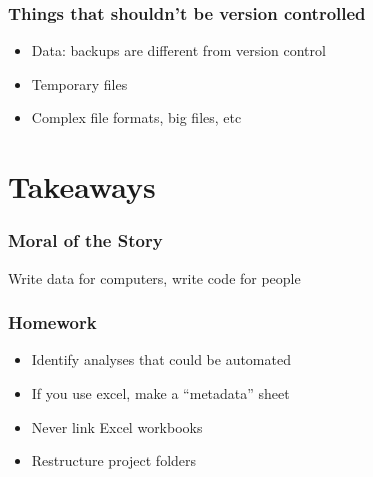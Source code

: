 \documentclass[10pt, compress]{beamer}
\begin{document}
\begin{frame}[fragile]
  \frametitle{Things that shouldn't be version controlled}
  \begin{itemize}
  \item Data: backups are different from version control
  \item Temporary files
  \item Complex file formats, big files, etc
\end{itemize}
\end{frame}

\section{Takeaways}
\begin{frame}[fragile]
  \frametitle{Moral of the Story}
  Write data for computers, write code for people
\end{frame}

\begin{frame}[fragile]
  \frametitle{Homework}
  \begin{itemize}
  \item Identify analyses that could be automated
  \item If you use excel, make a ``metadata'' sheet
  \item Never link Excel workbooks
  \item Restructure project folders
\end{itemize}
\end{frame}





\end{document}
